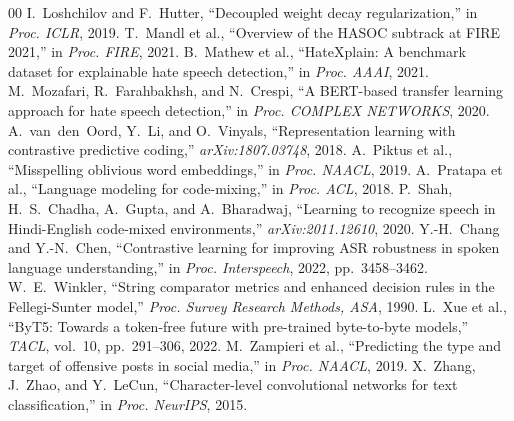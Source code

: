 \documentclass[conference]{IEEEtran}
\begin{document}
\begin{thebibliography}{00}
 I.~Loshchilov and F.~Hutter, ``Decoupled weight decay regularization,'' in \textit{Proc. ICLR}, 2019.
 T.~Mandl et al., ``Overview of the HASOC subtrack at FIRE 2021,'' in \textit{Proc. FIRE}, 2021.
 B.~Mathew et al., ``HateXplain: A benchmark dataset for explainable hate speech detection,'' in \textit{Proc. AAAI}, 2021.
 M.~Mozafari, R.~Farahbakhsh, and N.~Crespi, ``A BERT-based transfer learning approach for hate speech detection,'' in \textit{Proc. COMPLEX NETWORKS}, 2020.
 A.~van~den~Oord, Y.~Li, and O.~Vinyals, ``Representation learning with contrastive predictive coding,'' \textit{arXiv:1807.03748}, 2018.
 A.~Piktus et al., ``Misspelling oblivious word embeddings,'' in \textit{Proc. NAACL}, 2019.
 A.~Pratapa et al., ``Language modeling for code-mixing,'' in \textit{Proc. ACL}, 2018.
 P.~Shah, H.~S.~Chadha, A.~Gupta, and A.~Bharadwaj, ``Learning to recognize speech in Hindi-English code-mixed environments,'' \textit{arXiv:2011.12610}, 2020.
 Y.-H.~Chang and Y.-N.~Chen, ``Contrastive learning for improving ASR robustness in spoken language understanding,'' in \textit{Proc. Interspeech}, 2022, pp.~3458--3462.
 W.~E.~Winkler, ``String comparator metrics and enhanced decision rules in the Fellegi-Sunter model,'' \textit{Proc. Survey Research Methods, ASA}, 1990.
 L.~Xue et al., ``ByT5: Towards a token-free future with pre-trained byte-to-byte models,'' \textit{TACL}, vol.~10, pp.~291--306, 2022.
 M.~Zampieri et al., ``Predicting the type and target of offensive posts in social media,'' in \textit{Proc. NAACL}, 2019.
 X.~Zhang, J.~Zhao, and Y.~LeCun, ``Character-level convolutional networks for text classification,'' in \textit{Proc. NeurIPS}, 2015.
\end{thebibliography}
\end{document}
